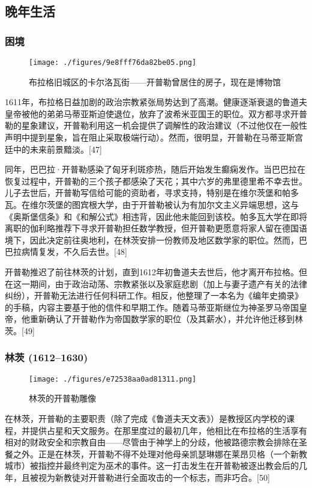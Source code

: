 \subsection{晚年生活}
\subsubsection{困境}
\begin{figure}[ht]
\centering
\texttt{[image: ./figures/9e8fff76da82be05.png]}
\caption{布拉格旧城区的卡尔洛瓦街——开普勒曾居住的房子，现在是博物馆} \label{fig_KPL1_8}
\end{figure}
1611年，布拉格日益加剧的政治宗教紧张局势达到了高潮。健康逐渐衰退的鲁道夫皇帝被他的弟弟马蒂亚斯迫使退位，放弃了波希米亚国王的职位。双方都寻求开普勒的星象建议，开普勒利用这一机会提供了调解性的政治建议（不过他仅在一般性声明中提到星象，旨在阻止采取极端行动）。然而，很明显，开普勒在马蒂亚斯宫廷中的未来前景黯淡。[47]

同年，巴巴拉·开普勒感染了匈牙利斑疹热，随后开始发生癫痫发作。当巴巴拉在恢复过程中，开普勒的三个孩子都感染了天花；其中六岁的弗里德里希不幸去世。儿子去世后，开普勒写信给可能的资助者，寻求支持，特别是在维尔茨堡和帕多瓦。在维尔茨堡的图宾根大学，由于开普勒被认为有加尔文主义异端思想，这与《奥斯堡信条》和《和解公式》相违背，因此他未能回到该校。帕多瓦大学在即将离职的伽利略推荐下寻求开普勒担任数学教授，但开普勒更愿意将家人留在德国语境下，因此决定前往奥地利，在林茨安排一份教师及地区数学家的职位。然而，巴巴拉病情复发，不久后去世。[48]

开普勒推迟了前往林茨的计划，直到1612年初鲁道夫去世后，他才离开布拉格。但在这一期间，由于政治动荡、宗教紧张以及家庭悲剧（加上与妻子遗产有关的法律纠纷），开普勒无法进行任何科研工作。相反，他整理了一本名为《编年史摘录》的手稿，内容主要基于他的信件和早期工作。随着马蒂亚斯继位为神圣罗马帝国皇帝，他重新确认了开普勒作为帝国数学家的职位（及其薪水），并允许他迁移到林茨。[49]
\subsubsection{林茨 (1612–1630)}
\begin{figure}[ht]
\centering
\texttt{[image: ./figures/e72538aa0ad81311.png]}
\caption{林茨的开普勒雕像} \label{fig_KPL1_9}
\end{figure}
在林茨，开普勒的主要职责（除了完成《鲁道夫天文表》）是教授区内学校的课程，并提供占星和天文服务。在那里度过的最初几年，他相比在布拉格的生活享有相对的财政安全和宗教自由——尽管由于神学上的分歧，他被路德宗教会排除在圣餐之外。正是在林茨，开普勒不得不处理对他母亲凯瑟琳娜在莱昂贝格（一个新教城市）被指控并最终判定为巫术的事件。这一打击发生在开普勒被逐出教会后的几年，且被视为新教徒对开普勒进行全面攻击的一个标志，而非巧合。[50]

